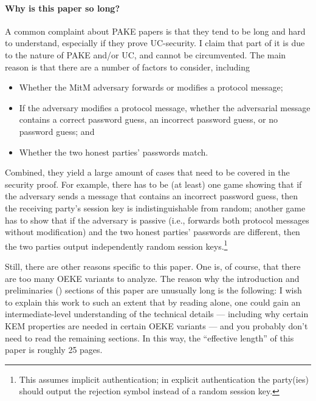 \documentclass{article}
\theoremstyle{plain}
\theoremstyle{definition}
\theoremstyle{remark}
\begin{document}
\paragraph{Why is this paper so long?}
A common complaint about PAKE papers is that they tend to be long and hard to understand, especially if they prove UC-security. I claim that part of it is due to the nature of PAKE and/or UC, and cannot be circumvented. The main reason is that there are a number of factors to consider, including
\begin{itemize}
  \item Whether the MitM adversary forwards or modifies a protocol message;
  \item If the adversary modifies a protocol message, whether the adversarial message contains a correct password guess, an incorrect password guess, or no password guess; and
  \item Whether the two honest parties' passwords match.
\end{itemize}
Combined, they yield a large amount of cases that need to be covered in the security proof. For example, there has to be (at least) one game showing that if the adversary sends a message that contains an incorrect password guess, then the receiving party's session key is indistinguishable from random; another game has to show that if the adversary is passive (i.e., forwards both protocol messages without modification) and the two honest parties' passwords are different, then the two parties output independently random session keys.\footnote{This assumes implicit authentication; in explicit authentication the party(ies) should output the rejection symbol instead of a random session key.}

Still, there are other reasons specific to this paper. One is, of course, that there are too many OEKE variants to analyze. The reason why the introduction and preliminaries () sections of this paper are unusually long is the following: I wish to explain this work to such an extent that by reading  alone, one could gain an intermediate-level understanding of the technical details --- including why certain KEM properties are needed in certain OEKE variants --- and you probably don't need to read the remaining sections. In this way, the ``effective length'' of this paper is roughly 25 pages.
\end{document}
